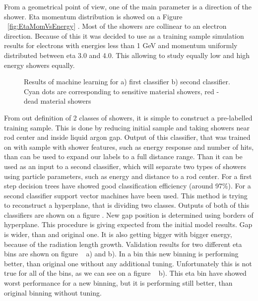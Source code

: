 From a geometrical point of view, one of the main parameter is a direction of the shower. Eta momentum distribution is showed on a Figure ~\ref{fig:EtaMomVsEnergy} . Most of the showers are collinear to an electron direction. Because of this it was decided to use as a training sample simulation results for electrons with energies less than 1 GeV and momentum uniformly distributed between eta 3.0 and 4.0. This allowing to study equally low and high energy showers equally.

\begin{figure}[!tbp]
\begin{minipage}[h]{0.49\linewidth}
\end{minipage}
\hfill
\begin{minipage}[h]{0.49\linewidth}
\end{minipage}
\caption{Results of machine learning for a) first classifier b) second classifier. Cyan dots are corresponding to sensitive material showers, red - dead material showers}
\label{fig:Class}
\end{figure}


From out definition of 2 classes of showers, it is simple to construct a pre-labelled training sample. This is done by reducing initial sample and taking showers near rod center and inside liquid argon gap. Output of this classifier, that was trained on with sample with shower features, such as energy response and number of hits, than can be used to expand our labels to a full distance range. Than it can be used as an input to a second classifier, which will separate two types of showers using particle parameters, such as energy and distance to a rod center. For a first step decision trees have showed good classification efficiency (around 97\%). For a second classifier support vector machines have been used. This method is trying to reconstruct a hyperplane, that is dividing two classes. Outputs of both of this classifiers are shown on a figure . New gap position is determined using borders of hyperplane. This procedure is giving expected from the initial model results. Gap is wider, than and original one. It is also getting bigger with bigger energy, because of the radiation length growth. 
Validation results for two different eta bins are shown on figure ~ a) and b). In a bin this new binning is performing better, than original one without any additional tuning. Unfortunately this is not true for all of the bins, as we can see on a figure ~ b). This eta bin have showed worst performance for a new binning, but it is performing still better, than original binning without tuning.

